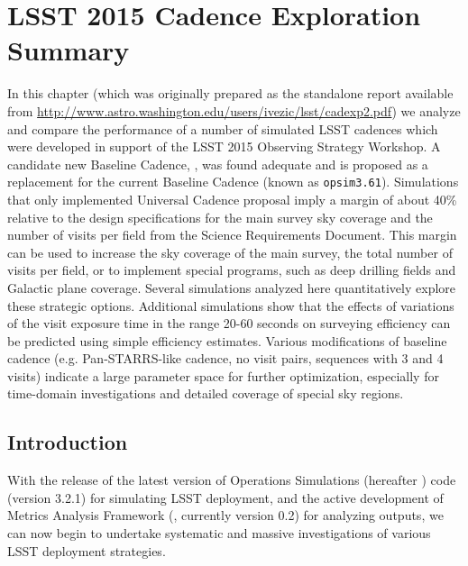 
\chapter[LSST 2015 Cadence Exploration]{LSST 2015 Cadence Exploration Summary}
\def\chpname{cadexp}\label{chp:\chpname}



 In this chapter (which was originally prepared
as the standalone report available from
\url{http://www.astro.washington.edu/users/ivezic/lsst/cadexp2.pdf})
we analyze and compare the performance of a number of simulated LSST
cadences which were developed in support of the LSST 2015 Observing
Strategy Workshop.  A candidate new Baseline Cadence,
, was found adequate and is proposed as  a
replacement for the current Baseline Cadence (known as
\texttt{opsim3.61}). Simulations that only implemented Universal
Cadence proposal imply a margin of about 40\% relative to the design
specifications for the main survey sky coverage and the number of
visits per field from the Science Requirements Document. This margin
can be used to increase the sky coverage of the main survey, the total
number of visits per field, or to implement special programs, such as
deep drilling fields and Galactic plane coverage. Several  simulations
analyzed here quantitatively explore these strategic options.
Additional simulations show that the effects of variations of the
visit exposure time in the  range 20-60 seconds on surveying
efficiency can be predicted using simple efficiency estimates. Various
modifications of baseline cadence (e.g. Pan-STARRS-like cadence,  no
visit pairs, sequences with 3 and 4 visits) indicate a large parameter
space for further optimization, especially for time-domain
investigations and detailed coverage of special sky regions.


\section{Introduction}
\def\secname{cadexp:intro}\label{sec:\secname}

With the release of the latest version of Operations Simulations
(hereafter \OpSim) code (version 3.2.1)  for simulating LSST
deployment, and the active development of Metrics Analysis Framework
(\MAF,  currently version 0.2) for analyzing \OpSim outputs, we can
now begin to undertake systematic and  massive investigations of
various LSST deployment strategies.

